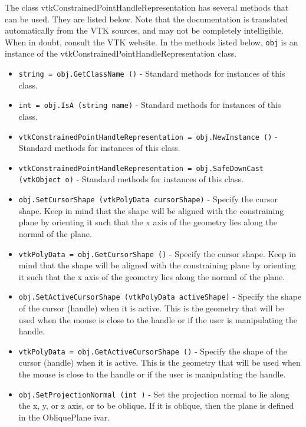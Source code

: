 The class vtkConstrainedPointHandleRepresentation has several methods that can be used.
  They are listed below.
Note that the documentation is translated automatically from the VTK sources,
and may not be completely intelligible.  When in doubt, consult the VTK website.
In the methods listed below, \verb|obj| is an instance of the vtkConstrainedPointHandleRepresentation class.
\begin{itemize}
\item  \verb|string = obj.GetClassName ()| -  Standard methods for instances of this class.

\item  \verb|int = obj.IsA (string name)| -  Standard methods for instances of this class.

\item  \verb|vtkConstrainedPointHandleRepresentation = obj.NewInstance ()| -  Standard methods for instances of this class.

\item  \verb|vtkConstrainedPointHandleRepresentation = obj.SafeDownCast (vtkObject o)| -  Standard methods for instances of this class.

\item  \verb|obj.SetCursorShape (vtkPolyData cursorShape)| -  Specify the cursor shape. Keep in mind that the shape will be
 aligned with the  constraining plane by orienting it such that
 the x axis of the geometry lies along the normal of the plane.

\item  \verb|vtkPolyData = obj.GetCursorShape ()| -  Specify the cursor shape. Keep in mind that the shape will be
 aligned with the  constraining plane by orienting it such that
 the x axis of the geometry lies along the normal of the plane.

\item  \verb|obj.SetActiveCursorShape (vtkPolyData activeShape)| -  Specify the shape of the cursor (handle) when it is active.
 This is the geometry that will be used when the mouse is
 close to the handle or if the user is manipulating the handle.

\item  \verb|vtkPolyData = obj.GetActiveCursorShape ()| -  Specify the shape of the cursor (handle) when it is active.
 This is the geometry that will be used when the mouse is
 close to the handle or if the user is manipulating the handle.

\item  \verb|obj.SetProjectionNormal (int )| -  Set the projection normal to lie along the x, y, or z axis,
 or to be oblique. If it is oblique, then the plane is 
 defined in the ObliquePlane ivar.


\end{itemize}
